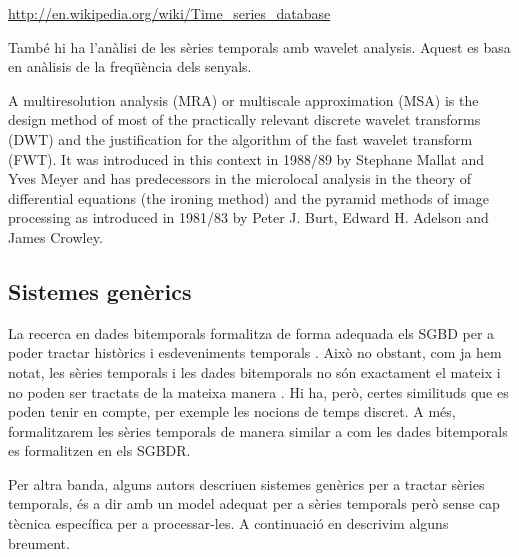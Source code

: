 \url{http://en.wikipedia.org/wiki/Time_series_database}




 








També hi ha l'anàlisi de les sèries temporals amb wavelet analysis. Aquest es basa en anàlisis de la freqüència dels senyals. 

A multiresolution analysis (MRA) or multiscale approximation (MSA) is the design method of most of the practically relevant discrete wavelet transforms (DWT) and the justification for the algorithm of the fast wavelet transform (FWT). It was introduced in this context in 1988/89 by Stephane Mallat and Yves Meyer and has predecessors in the microlocal analysis in the theory of differential equations (the ironing method) and the pyramid methods of image processing as introduced in 1981/83 by Peter J. Burt, Edward H. Adelson and James Crowley.






\todo{}






\subsection{Sistemes genèrics}


La recerca en dades bitemporals formalitza de forma adequada els
\gls{SGBD} per a poder tractar històrics i esdeveniments
temporals \parencite{jensen99:temporaldata,date02:_tempor_data_relat_model}. Això
no obstant, com ja hem notat, les sèries temporals i les dades
bitemporals no són exactament el mateix i no poden ser tractats de la
mateixa manera \parencite{schmidt95}. Hi ha, però, certes similituds
que es poden tenir en compte, per exemple les nocions de temps
discret. A més, formalitzarem les sèries temporals de manera similar a
com les dades bitemporals es formalitzen en els \gls{SGBDR}.



Per altra banda, alguns autors descriuen sistemes genèrics per a
tractar sèries temporals, és a dir amb un model adequat per a sèries temporals però sense cap tècnica específica per a processar-les. A continuació en descrivim alguns breument.




